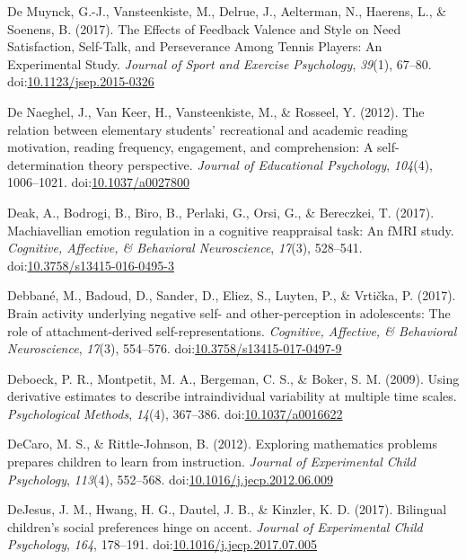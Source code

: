 \documentclass[english,man]{apa6}
\theoremstyle{definition}
\theoremstyle{definition}
\theoremstyle{definition}
\theoremstyle{remark}
\begin{document}
\hypertarget{ref-DeMuynck2017a}{}
De Muynck, G.-J., Vansteenkiste, M., Delrue, J., Aelterman, N., Haerens,
L., \& Soenens, B. (2017). The Effects of Feedback Valence and Style on
Need Satisfaction, Self-Talk, and Perseverance Among Tennis Players: An
Experimental Study. \emph{Journal of Sport and Exercise Psychology},
\emph{39}(1), 67--80.
doi:\href{https://doi.org/10.1123/jsep.2015-0326}{10.1123/jsep.2015-0326}

\hypertarget{ref-DeNaeghel2012}{}
De Naeghel, J., Van Keer, H., Vansteenkiste, M., \& Rosseel, Y. (2012).
The relation between elementary students' recreational and academic
reading motivation, reading frequency, engagement, and comprehension: A
self-determination theory perspective. \emph{Journal of Educational
Psychology}, \emph{104}(4), 1006--1021.
doi:\href{https://doi.org/10.1037/a0027800}{10.1037/a0027800}

\hypertarget{ref-Deak2017}{}
Deak, A., Bodrogi, B., Biro, B., Perlaki, G., Orsi, G., \& Bereczkei, T.
(2017). Machiavellian emotion regulation in a cognitive reappraisal
task: An fMRI study. \emph{Cognitive, Affective, \& Behavioral
Neuroscience}, \emph{17}(3), 528--541.
doi:\href{https://doi.org/10.3758/s13415-016-0495-3}{10.3758/s13415-016-0495-3}

\hypertarget{ref-Debbane2017}{}
Debbané, M., Badoud, D., Sander, D., Eliez, S., Luyten, P., \& Vrtička,
P. (2017). Brain activity underlying negative self- and other-perception
in adolescents: The role of attachment-derived self-representations.
\emph{Cognitive, Affective, \& Behavioral Neuroscience}, \emph{17}(3),
554--576.
doi:\href{https://doi.org/10.3758/s13415-017-0497-9}{10.3758/s13415-017-0497-9}

\hypertarget{ref-Deboeck2009}{}
Deboeck, P. R., Montpetit, M. A., Bergeman, C. S., \& Boker, S. M.
(2009). Using derivative estimates to describe intraindividual
variability at multiple time scales. \emph{Psychological Methods},
\emph{14}(4), 367--386.
doi:\href{https://doi.org/10.1037/a0016622}{10.1037/a0016622}

\hypertarget{ref-DeCaro2012}{}
DeCaro, M. S., \& Rittle-Johnson, B. (2012). Exploring mathematics
problems prepares children to learn from instruction. \emph{Journal of
Experimental Child Psychology}, \emph{113}(4), 552--568.
doi:\href{https://doi.org/10.1016/j.jecp.2012.06.009}{10.1016/j.jecp.2012.06.009}

\hypertarget{ref-DeJesus2017}{}
DeJesus, J. M., Hwang, H. G., Dautel, J. B., \& Kinzler, K. D. (2017).
Bilingual children's social preferences hinge on accent. \emph{Journal
of Experimental Child Psychology}, \emph{164}, 178--191.
doi:\href{https://doi.org/10.1016/j.jecp.2017.07.005}{10.1016/j.jecp.2017.07.005}
\end{document}
